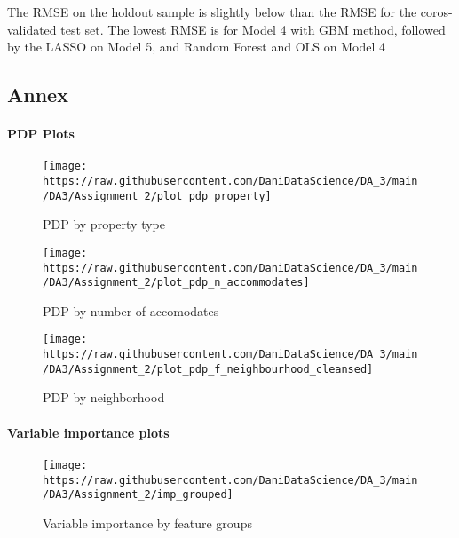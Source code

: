 \documentclass[
]{article}
\begin{document}
The RMSE on the holdout sample is slightly below than the RMSE for the
coros-validated test set. The lowest RMSE is for Model 4 with GBM
method, followed by the LASSO on Model 5, and Random Forest and OLS on
Model 4

\hypertarget{annex}{%
\subsection{Annex}\label{annex}}

\hypertarget{pdp-plots}{%
\paragraph{PDP Plots}\label{pdp-plots}}

\begin{figure}

{\centering \texttt{[image: https://raw.githubusercontent.com/DaniDataScience/DA\_3/main/DA3/Assignment\_2/plot\_pdp\_property]} 

}

\caption{PDP by property type}\label{fig:unnamed-chunk-6}
\end{figure}

\begin{figure}

{\centering \texttt{[image: https://raw.githubusercontent.com/DaniDataScience/DA\_3/main/DA3/Assignment\_2/plot\_pdp\_n\_accommodates]} 

}

\caption{PDP by number of accomodates}\label{fig:unnamed-chunk-7}
\end{figure}

\begin{figure}

{\centering \texttt{[image: https://raw.githubusercontent.com/DaniDataScience/DA\_3/main/DA3/Assignment\_2/plot\_pdp\_f\_neighbourhood\_cleansed]} 

}

\caption{PDP by neighborhood}\label{fig:unnamed-chunk-8}
\end{figure}

\hypertarget{variable-importance-plots}{%
\paragraph{Variable importance plots}\label{variable-importance-plots}}

\begin{figure}

{\centering \texttt{[image: https://raw.githubusercontent.com/DaniDataScience/DA\_3/main/DA3/Assignment\_2/imp\_grouped]} 

}

\caption{Variable importance by feature groups}\label{fig:unnamed-chunk-9}
\end{figure}
\end{document}

